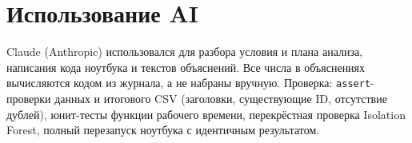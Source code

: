\documentclass[10pt,a4paper]{article}
\begin{document}
\section{Использование AI}
Claude (Anthropic) использовался для разбора условия и плана анализа, написания кода ноутбука и текстов объяснений. Все числа в объяснениях вычисляются кодом из журнала, а не набраны вручную. Проверка: \texttt{assert}-проверки данных и итогового CSV (заголовки, существующие ID, отсутствие дублей), юнит-тесты функции рабочего времени, перекрёстная проверка Isolation Forest, полный перезапуск ноутбука с идентичным результатом. %
\end{document}
